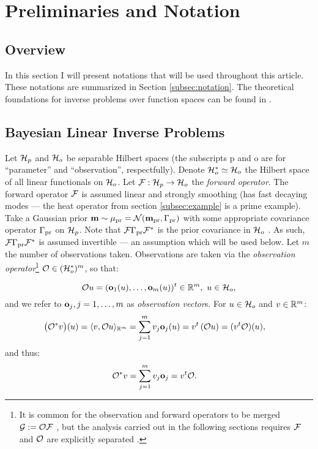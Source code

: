 \section{Preliminaries and Notation}\label{section:prelim}

\subsection{Overview}
In this section I will present notations that will be used throughout
this article. These notations are summarized in Section
\ref{subsec:notation}. The theoretical foundations for inverse
problems over function spaces can be found in
\cite{Stuart10}.


\subsection{Bayesian Linear Inverse Problems}\label{subsec:abstract OED}
Let $\mathcal{H}_p$ and $\mathcal{H}_o$ be separable Hilbert spaces (the subscripts p
and o are for ``parameter'' and ``observation'', respectfully). Denote
$\mathcal{H}_o^* \simeq \mathcal{H}_o$ the Hilbert space of all linear functionals on
$\mathcal{H}_o$. Let $\mathcal{F}: \mathcal{H}_p \to \mathcal{H}_o$ the \emph{forward operator}. The
forward operator $\mathcal{F}$ is assumed linear and strongly smoothing (has
fast decaying modes --- the heat operator from section
\ref{subsec:example} is a prime example). Take a Gaussian prior
$\mathbf{m} \sim \mu_{\textup{pr}} = \mathcal{N}(\mathbf{m}_{\textup{pr}} ,\Gamma_{\textup{pr}})$ with some appropriate
covariance operator $\Gamma_{\textup{pr}}$ \cite{Stuart10} on $\mathcal{H}_p$. Note that
$\mathcal{F} \Gamma_{\textup{pr}} \mathcal{F}^*$ is the prior covariance in $\mathcal{H}_o$
\cite{Stuart10}. As such, $\mathcal{F} \Gamma_{\textup{pr}} \mathcal{F}^*$ is assumed invertible
--- an assumption which will be used below. Let $m$ the number of
observations taken. Observations are taken via the \emph{observation
operator}\footnote{It is common for the observation and forward
operators to be merged $\mathcal{G} := \mathcal{O} \mathcal{F}$
\cite{AlexanderianGloorGhattas14}, but the analysis carried out in the
following sections requires $\mathcal{F}$ and $\mathcal{O}$ are explicitly
separated \cite{cvetkovic2023choosing}.} $\mathcal{O} \in ( \mathcal{H}_o^* )^m$, so that:

\begin{equation*}%
  \obs u = (\meas_1(u), \dots, \meas_m(u) )^t \in \R^m,\ u \in \hilo,
\end{equation*}
%
%
and we refer to $\mathbf{o}_j, j=1,\dots,m$ as \emph{observation
vector}s. For $u \in \mathcal{H}_o$ and $v\in \mathbb{R}^m$:
%
%
\begin{align*}
  \big (\obs^*v \big ) (u) &= \langle v, \obs u \rangle_{\R^m} = \sum_{j=1}^m  v_j \meas_j(u)
  = v^t \left ( \obs u \right ) = (v^t \obs) (u),
\end{align*}
and thus:
\begin{align}\label{eq:obs*}
  \obs^*v &= \sum_{j=1}^m v_j \meas_j = v^t \obs.
\end{align}

